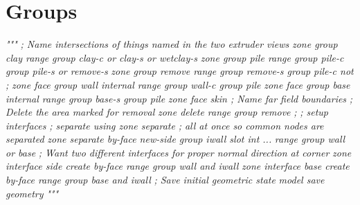 \documentclass[a4paper, nobind]{templates/ociamthesis}
\newenvironment{Shaded}{\begin{snugshade}}{\end{snugshade}}
\newcommand{\CommentTok}[1]{\textcolor[rgb]{0.56,0.35,0.01}{\textit{#1}}}
\renewenvironment{Shaded}
{
  \vspace{10pt}%
  \begin{snugshade}%
}{%
  \end{snugshade}%
  \vspace{8pt}%
}
\begin{document}
\hypertarget{groups-2}{%
\section{Groups}\label{groups-2}}

\begin{Shaded}
\begin{Highlighting}[]
\CommentTok{"""}
\CommentTok{; Name intersections of things named in the two extruder views}
\CommentTok{zone group \textquotesingle{}clay\textquotesingle{} range group \textquotesingle{}clay{-}c\textquotesingle{} or \textquotesingle{}clay{-}s\textquotesingle{} or \textquotesingle{}wetclay{-}s\textquotesingle{}}
\CommentTok{zone group \textquotesingle{}pile\textquotesingle{} range group \textquotesingle{}pile{-}c\textquotesingle{} group \textquotesingle{}pile{-}s\textquotesingle{} or \textquotesingle{}remove{-}s\textquotesingle{}}
\CommentTok{zone group \textquotesingle{}remove\textquotesingle{} range group \textquotesingle{}remove{-}s\textquotesingle{} group \textquotesingle{}pile{-}c\textquotesingle{} not ; }
\CommentTok{zone face group \textquotesingle{}wall\textquotesingle{} internal range group \textquotesingle{}wall{-}c\textquotesingle{} group \textquotesingle{}pile\textquotesingle{}}
\CommentTok{zone face group \textquotesingle{}base\textquotesingle{} internal range group \textquotesingle{}base{-}s\textquotesingle{} group \textquotesingle{}pile\textquotesingle{}}
\CommentTok{zone face skin ; Name far field boundaries}
\CommentTok{; Delete the area marked for removal}
\CommentTok{zone delete range group \textquotesingle{}remove\textquotesingle{}}
\CommentTok{;}
\CommentTok{; setup interfaces}
\CommentTok{; separate using zone separate}
\CommentTok{; all at once so common nodes are separated}
\CommentTok{zone separate by{-}face new{-}side group \textquotesingle{}iwall\textquotesingle{} slot \textquotesingle{}int\textquotesingle{} ...}
\CommentTok{     range group \textquotesingle{}wall\textquotesingle{} or \textquotesingle{}base\textquotesingle{}}
\CommentTok{; Want two different interfaces for proper normal direction at corner}
\CommentTok{zone interface \textquotesingle{}side\textquotesingle{} create by{-}face range group \textquotesingle{}wall\textquotesingle{} and \textquotesingle{}iwall\textquotesingle{}}
\CommentTok{zone interface \textquotesingle{}base\textquotesingle{} create by{-}face range group \textquotesingle{}base\textquotesingle{} and \textquotesingle{}iwall\textquotesingle{}}
\CommentTok{; Save initial geometric state}
\CommentTok{model save \textquotesingle{}geometry\textquotesingle{}}
\CommentTok{"""}
\end{Highlighting}
\end{Shaded}
\end{document}
